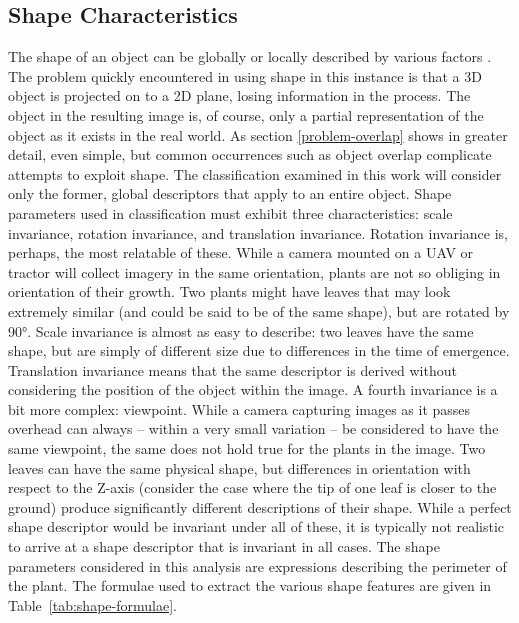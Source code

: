 \documentclass[letterpaper, notitlepage]{report}
\begin{document}
{\subsection{Shape Characteristics}
The shape of an object can be globally or locally described by various factors \parencite{Zhang2004-cm}. The problem quickly encountered in using shape in this instance is that a 3D object is projected on to a 2D plane, losing information in the process. The object in the resulting image is, of course, only a partial representation of the object as it exists in the real world. As section \ref{problem-overlap} shows in greater detail, even simple, but common occurrences such as object overlap complicate attempts to exploit shape. The classification examined in this work will consider only the former, global descriptors that apply to an entire object. Shape parameters used in classification must exhibit three characteristics: scale invariance, rotation invariance, and translation invariance. Rotation invariance is, perhaps, the most relatable of these. While a camera mounted on a UAV or tractor will collect imagery in the same orientation, plants are not so obliging in orientation of their growth. Two plants might have leaves that may look extremely similar (and could be said to be of the same shape), but are rotated by 90\si{\degree}. Scale invariance is almost as easy to describe: two leaves have the same shape, but are simply of different size due to differences in the time of emergence. Translation invariance means that the same descriptor is derived without considering the position of the object within the image.  A fourth invariance is a bit more complex: viewpoint. While a camera capturing images as it passes overhead can always -- within a very small variation -- be considered to have the same viewpoint, the same does not hold true for the plants in the image. Two leaves can have the same physical shape, but differences in orientation with respect to the Z-axis (consider the case where the tip of one leaf is closer to the ground) produce significantly different descriptions of their shape. While a perfect shape descriptor would be invariant under all of these, it is typically not realistic to arrive at a shape descriptor that is invariant in all cases.
The shape parameters considered in this analysis are expressions describing the perimeter of the plant. The formulae used to extract the various shape features are given in Table~\ref{tab:shape-formulae}.

}
\end{document}
